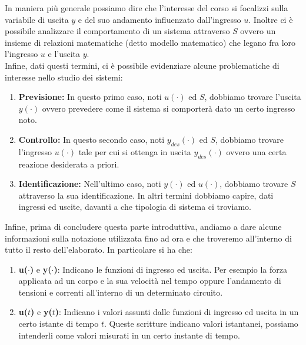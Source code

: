 \documentclass[../main.tex]{subfiles}
\begin{document}
In maniera più generale possiamo dire che l'interesse del corso si focalizzi sulla variabile di uscita $y$ e del suo andamento influenzato dall'ingresso $u$.
Inoltre ci è possibile analizzare il comportamento di un sistema attraverso $S$ ovvero un insieme di relazioni matematiche (detto modello matematico) che legano fra loro l'ingresso $u$ e l'uscita $y$.\\

Infine, dati questi termini, ci è possibile evidenziare alcune problematiche di interesse nello studio dei sistemi:

\begin{enumerate}
	\item[\textbf{-}] \textbf{Previsione:} In questo primo caso, noti $u(\cdot)$ ed $S$, dobbiamo trovare l'uscita $y(\cdot)$ ovvero prevedere come il sistema si comporterà dato un certo ingresso noto. 
	
	\item[\textbf{-}] \textbf{Controllo:} In questo secondo caso, noti $y_{des}(\cdot)$ ed $S$, dobbiamo trovare l'ingresso $u(\cdot)$ tale per cui si ottenga in uscita $y_{des}(\cdot)$ ovvero una certa reazione desiderata a priori.
	
	\item[\textbf{-}] \textbf{Identificazione:} Nell'ultimo caso, noti $y(\cdot)$ ed $u(\cdot)$, dobbiamo trovare $S$ attraverso la sua identificazione. In altri termini dobbiamo capire, dati ingressi ed uscite, davanti a che tipologia di sistema ci troviamo.
\end{enumerate}

Infine, prima di concludere questa parte introduttiva, andiamo a dare alcune informazioni sulla notazione utilizzata fino ad ora e che troveremo all'interno di tutto il resto dell'elaborato.
In particolare si ha che:

\begin{enumerate}
	\item[\textbf{-}] \textbf{u($\cdot$)} e \textbf{y($\cdot$)}: Indicano le funzioni di ingresso ed uscita. Per esempio la forza applicata ad un corpo e la sua velocità nel tempo oppure l'andamento di tensioni e correnti all'interno di un determinato circuito.
	
	\item[\textbf{-}] \textbf{u($t$)} e \textbf{y($t$)}: Indicano i valori assunti dalle funzioni di ingresso ed uscita in un certo istante di tempo $t$. Queste scritture indicano valori istantanei, possiamo intenderli come valori misurati in un certo instante di tempo.
	
\end{enumerate}
\end{document}
